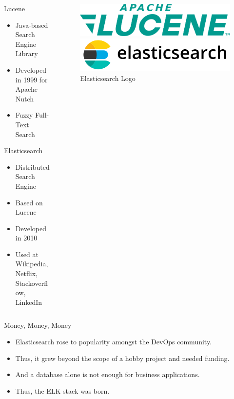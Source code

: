 \documentclass[compress,aspectratio=169]{beamer}
\begin{document}
\begin{frame}
\begin{columns}[T]
\begin{column}{0.5\textwidth}
\begin{block}{Lucene}
\begin{itemize}
  \item Java-based Search Engine Library
  \item Developed in 1999 for Apache Nutch
  \item Fuzzy Full-Text Search
\end{itemize}
\end{block}
\begin{block}{Elasticsearch}
\begin{itemize}
  \item Distributed Search Engine
  \item Based on Lucene
  \item Developed in 2010
  \item Used at Wikipedia, Netflix, Stackoverflow, LinkedIn
\end{itemize}
\end{block}
\end{column}
\begin{column}{0.5\textwidth}
\vspace{1cm}
\begin{figure}
  \includegraphics[width=\textwidth]{lucene.png}
  \caption{Lucene Logo}
  \includegraphics[width=\textwidth]{elasticsearch.png}
  \caption{Elasticsearch Logo}
\end{figure}
\end{column}
\end{columns}
\end{frame}

\begin{frame}{Money, Money, Money}
\begin{itemize}
  \item Elasticsearch rose to popularity amongst the DevOps community.
  \item Thus, it grew beyond the scope of a hobby project and needed funding.
  \item And a database alone is not enough for business applications.
  \item Thus, the ELK stack was born.
\end{itemize}
\end{frame}
\end{document}
